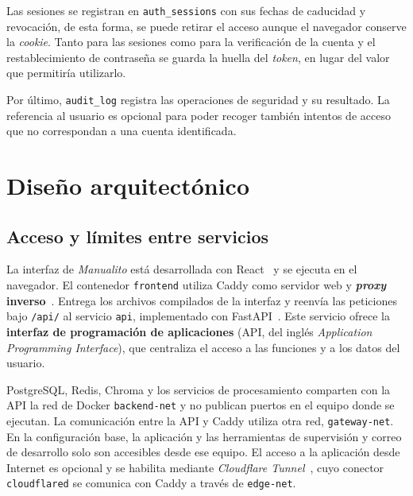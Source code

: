 Las sesiones se registran en \texttt{auth\_\allowbreak{}sessions} con sus
fechas de caducidad y revocación, de esta forma, se puede retirar el acceso aunque el
navegador conserve la \textit{cookie}. Tanto para las sesiones como para la
verificación de la cuenta y el restablecimiento de contraseña se guarda la
huella del \textit{token}, en lugar del valor que permitiría utilizarlo.

Por último, \texttt{audit\_\allowbreak{}log} registra las operaciones de
seguridad y su resultado. La referencia al usuario es opcional para poder
recoger también intentos de acceso que no correspondan a una cuenta
identificada.


\FloatBarrier
\section{Diseño arquitectónico}

\FloatBarrier
\subsection{Acceso y límites entre servicios}

La interfaz de \textit{Manualito} está desarrollada con React~\cite{react_documentation} y se ejecuta
en el navegador. El contenedor \texttt{frontend} utiliza Caddy como servidor
web y \textbf{\textit{proxy} inverso}~\cite{caddy_reverse_proxy}. Entrega los
archivos compilados de la interfaz y reenvía las peticiones bajo
\texttt{/api/} al servicio \texttt{api}, implementado con FastAPI~\cite{fastapi_documentation}. Este
servicio ofrece la \textbf{interfaz de programación de aplicaciones}
(\acs{API}, del inglés \textit{Application Programming Interface}),
que centraliza el acceso a las funciones y a los datos del usuario.

PostgreSQL, Redis, Chroma y los servicios de procesamiento comparten con la
\ac{API} la red de Docker \texttt{backend-net} y no publican puertos en el
equipo donde se ejecutan. La comunicación entre la \ac{API} y Caddy utiliza
otra red, \texttt{gateway-net}. En la
configuración base, la aplicación y las herramientas de supervisión y correo
de desarrollo solo son accesibles desde ese equipo. El acceso a la aplicación
desde Internet es opcional y se habilita mediante
\textit{Cloudflare Tunnel}~\cite{cloudflare_tunnel}, cuyo conector
\texttt{cloudflared} se comunica con Caddy a través de \texttt{edge-net}.


